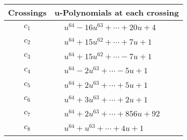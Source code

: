 \documentclass[1p]{elsarticle_modified}
\theoremstyle{definition}
\begin{document}
\begin{tabular}{m{50pt}|m{274pt}}
Crossings & \hspace{64pt}u-Polynomials at each crossing \\
\hline $$\begin{aligned}c_{1}\end{aligned}$$&$\begin{aligned}
&u^{64}-16 u^{63}+\cdots+20 u+4
\end{aligned}$\\
\hline $$\begin{aligned}c_{2}\end{aligned}$$&$\begin{aligned}
&u^{64}+15 u^{62}+\cdots+7 u+1
\end{aligned}$\\
\hline $$\begin{aligned}c_{3}\end{aligned}$$&$\begin{aligned}
&u^{64}+15 u^{62}+\cdots-7 u+1
\end{aligned}$\\
\hline $$\begin{aligned}c_{4}\end{aligned}$$&$\begin{aligned}
&u^{64}-2 u^{63}+\cdots-5 u+1
\end{aligned}$\\
\hline $$\begin{aligned}c_{5}\end{aligned}$$&$\begin{aligned}
&u^{64}+2 u^{63}+\cdots+5 u+1
\end{aligned}$\\
\hline $$\begin{aligned}c_{6}\end{aligned}$$&$\begin{aligned}
&u^{64}+3 u^{63}+\cdots+2 u+1
\end{aligned}$\\
\hline $$\begin{aligned}c_{7}\end{aligned}$$&$\begin{aligned}
&u^{64}+2 u^{63}+\cdots+856 u+92
\end{aligned}$\\
\hline $$\begin{aligned}c_{8}\end{aligned}$$&$\begin{aligned}
&u^{64}+u^{63}+\cdots+4 u+1
\end{aligned}$\\

\end{tabular}
\end{document}
